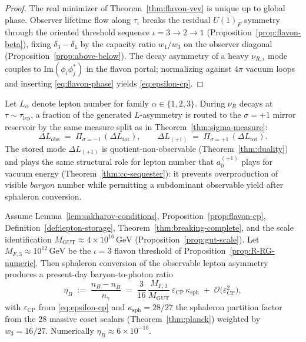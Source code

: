 \begin{proof}
The real minimizer of Theorem~\ref{thm:flavon-vev} is unique up to global
phase. Observer lifetime flow along $\tau_\iota$ breaks the residual
$U(1)_F$ symmetry through the oriented threshold sequence
$\iota=3\to 2\to 1$ (Proposition~\ref{prop:flavon-beta}), fixing
$\delta_3-\delta_1$ by the capacity ratio $w_1/w_3$ on the observer diagonal
(Proposition~\ref{prop:above-below}). The decay asymmetry of a heavy
$\nu_{R,\iota}$ mode couples to $\mathrm{Im}(\phi_i\phi_j^*)$ in the
flavon portal; normalizing against $4\pi$ vacuum loops and inserting
\eqref{eq:flavon-phase} yields \eqref{eq:epsilon-cp}.
\end{proof}

\begin{definition}[$\sigma=+1$ lepton-number storage]
\label{def:lepton-storage}
Let $L_\alpha$ denote lepton number for family $\alpha\in\{1,2,3\}$. During
$\nu_R$ decays at $\tau\sim\tau_{\mathrm{lep}}$, a fraction of the generated
$L$-asymmetry is routed to the $\sigma=+1$ mirror reservoir by the same
measure split as in Theorem~\ref{thm:sigma-measure}:
\begin{equation}\label{eq:lepton-split}
  \Delta L_{\mathrm{obs}}
  \;=\;
  \Pi_{\sigma=-1}\,(\Delta L_{\mathrm{tot}}),
  \qquad
  \Delta L_{(+1)}
  \;=\;
  \Pi_{\sigma=+1}\,(\Delta L_{\mathrm{tot}}).
\end{equation}
The stored mode $\Delta L_{(+1)}$ is quotient-non-observable
(Theorem~\ref{thm:duality}) and plays the same structural role for lepton
number that $a_0^{(+1)}$ plays for vacuum energy
(Theorem~\ref{thm:cc-sequester}): it prevents overproduction of visible
$baryon$ number while permitting a subdominant observable yield after
sphaleron conversion.
\end{definition}

\begin{theorem}\label{thm:baryogenesis}
Assume Lemma~\ref{lem:sakharov-conditions}, Proposition~\ref{prop:flavon-cp},
Definition~\ref{def:lepton-storage}, Theorem~\ref{thm:breaking-complete},
and the scale identification $M_{\mathrm{GUT}}\approx 4\times 10^{16}\,\mathrm{GeV}$
(Proposition~\ref{prop:gut-scale}). Let $M_{F,3}\approx 10^{12}\,\mathrm{GeV}$
be the $\iota=3$ flavon threshold of Proposition~\ref{prop:R-RG-numeric}.
Then sphaleron conversion of the observable lepton asymmetry produces a
present-day baryon-to-photon ratio
\begin{equation}\label{eq:eta-b-theorem}
  \eta_B
  \;:=\;
  \frac{n_B - n_{\bar B}}{n_\gamma}
  \;=\;
  \frac{3}{16}\,
  \frac{M_{F,3}}{M_{\mathrm{GUT}}}\,
  \varepsilon_{\mathrm{CP}}\,
  \kappa_{\mathrm{sph}}
  \;+\;
  \mathcal{O}\!\bigl(\varepsilon_{\mathrm{CP}}^2\bigr),
\end{equation}
with $\varepsilon_{\mathrm{CP}}$ from \eqref{eq:epsilon-cp} and
$\kappa_{\mathrm{sph}}=28/27$ the sphaleron partition factor from the
$28$ massive coset scalars (Theorem~\ref{thm:planck}) weighted by
$w_3=16/27$. Numerically $\eta_B\approx 6\times 10^{-10}$.
\end{theorem}


